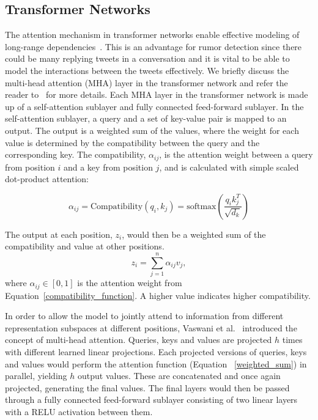 \documentclass[letterpaper]{article} %
\begin{document}
\subsection{Transformer Networks}
The attention mechanism in transformer networks enable effective modeling of long-range dependencies~\cite{DBLP:journals/corr/VaswaniSPUJGKP17}.
This is an advantage for rumor detection since there could be many replying tweets in a conversation and it is vital to be able to model the interactions between the tweets effectively. We briefly discuss the multi-head attention (MHA) layer in the transformer network and refer the reader to~\cite{DBLP:journals/corr/VaswaniSPUJGKP17} for more details.
Each MHA layer in the transformer network is made up of a self-attention sublayer and fully connected feed-forward sublayer.
In the self-attention sublayer, a query and a set of key-value pair is mapped to an output. The output is a weighted sum of the values, where the weight for each value is determined by the compatibility between the query and the corresponding key. The compatibility, $\alpha_{ij}$, is the attention weight between a query from position $i$ and a key from position $j$, and is calculated with simple scaled dot-product attention:

\begin{equation}
\alpha_{ij} = \mathrm{Compatibility}(q_{i}, k_{j}) = \mathrm{softmax}(\frac{q_{i}k_{j}^T}{\sqrt{d_{k}}}) \label{compatibility_function}
\end{equation}

The output at each position, $z_i$, would then be a weighted sum of the compatibility and value at other positions.
\begin{equation}
z_i = \sum_{j=1}^{n} \alpha_{ij} v_j, \label{weighted_sum}
\end{equation}
where $\alpha_{ij} \in [0,1]$ is the attention weight from Equation~\ref{compatibility_function}. A higher value indicates higher compatibility.

In order to allow the model to jointly attend to information from different representation subspaces at different positions, Vaswani et al.~ introduced the concept of multi-head attention. Queries, keys and values are projected $h$ times with different learned linear projections. Each projected versions of queries, keys and values would perform the attention function (Equation ~\ref{weighted_sum}) in parallel, yielding $h$ output values. These are concatenated and once again projected, generating the final values. The final layers would then be passed through a fully connected feed-forward sublayer consisting of two linear layers with a RELU activation between them.
\end{document}

